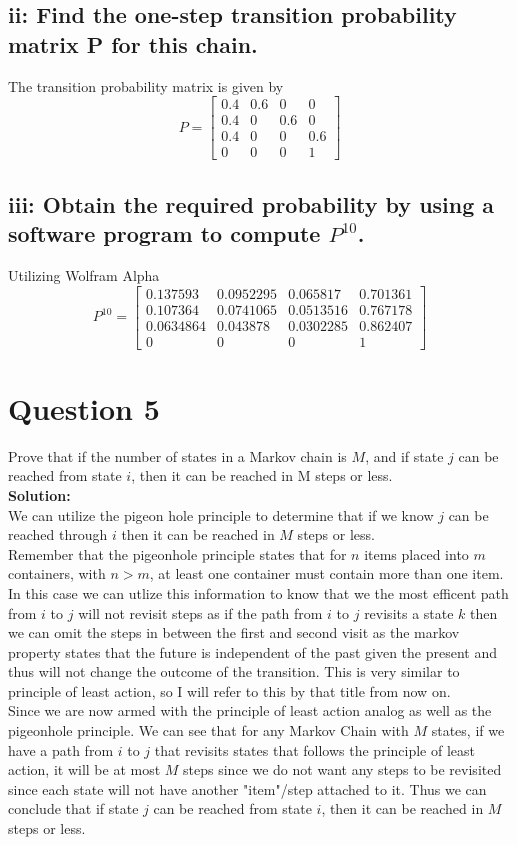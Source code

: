 \documentclass{article}
\begin{document}
\subsection*{ii:  Find the one-step transition probability matrix P for this chain.}
The transition probability matrix is given by
$$ P = \begin{bmatrix}
    0.4 & 0.6 & 0 & 0\\
    0.4 & 0 & 0.6 & 0\\
    0.4 & 0 & 0 & 0.6\\
    0 & 0 & 0 & 1
\end{bmatrix}$$

\subsection*{iii:  Obtain the required probability by using a software program to compute $P^{10}$.}
Utilizing Wolfram Alpha 
$$P^{10} = \begin{bmatrix}
0.137593 & 0.0952295 & 0.065817 & 0.701361 \\
0.107364 & 0.0741065 & 0.0513516 & 0.767178 \\
0.0634864 & 0.043878 & 0.0302285 & 0.862407 \\
0 & 0 & 0 & 1 
\end{bmatrix}$$


\section*{Question 5}
Prove that if the number of states in a Markov chain is $M$, and if state $j$
can be reached from state $i$, then it can be reached in M steps or less.\\
\textbf{Solution:}\\
We can utilize the pigeon hole principle to determine that if we know $j$ can be reached through $i$ then it can be reached in $M$ steps or less.\\
Remember that the pigeonhole principle states that for $n$ items placed into $m$ containers, with $n > m$, at least one container must contain more than one item.\\
In this case we can utlize this information to know that we the most efficent path from $i$ to $j$ will not revisit steps as if the path from $i$ to $j$ revisits a state $k$ then we can omit the steps in between the first and second visit as the markov property states that the future is independent of the past given the present and thus will not change the outcome of the transition. This is very similar to principle of least action, so I will refer to this by that title from now on.\\
Since we are now armed with the principle of least action analog as well as the pigeonhole principle. We can see that for any Markov Chain with $M$ states, if we have a path from $i$ to $j$ that revisits states that follows the principle of least action, it will be at most $M$ steps since we do not want any steps to be revisited since each state will not have another "item"/step attached to it. Thus we can conclude that if state $j$ can be reached from state $i$, then it can be reached in $M$ steps or less.
\end{document}
